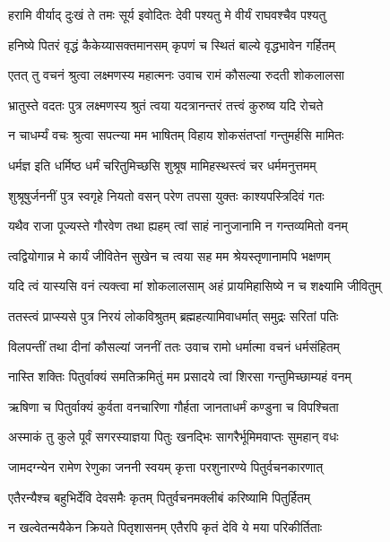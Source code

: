 \twolineshloka
{हरामि वीर्याद् दुःखं ते तमः सूर्य इवोदितः}
{देवी पश्यतु मे वीर्यं राघवश्चैव पश्यतु} %

\twolineshloka
{हनिष्ये पितरं वृद्धं कैकेय्यासक्तमानसम्}
{कृपणं च स्थितं बाल्ये वृद्धभावेन गर्हितम्} %

\twolineshloka
{एतत् तु वचनं श्रुत्वा लक्ष्मणस्य महात्मनः}
{उवाच रामं कौसल्या रुदती शोकलालसा} %

\twolineshloka
{भ्रातुस्ते वदतः पुत्र लक्ष्मणस्य श्रुतं त्वया}
{यदत्रानन्तरं तत्त्वं कुरुष्व यदि रोचते} %

\twolineshloka
{न चाधर्म्यं वचः श्रुत्वा सपत्न्या मम भाषितम्}
{विहाय शोकसंतप्तां गन्तुमर्हसि मामितः} %

\twolineshloka
{धर्मज्ञ इति धर्मिष्ठ धर्मं चरितुमिच्छसि}
{शुश्रूष मामिहस्थस्त्वं चर धर्ममनुत्तमम्} %

\twolineshloka
{शुश्रूषुर्जननीं पुत्र स्वगृहे नियतो वसन्}
{परेण तपसा युक्तः काश्यपस्त्रिदिवं गतः} %

\twolineshloka
{यथैव राजा पूज्यस्ते गौरवेण तथा ह्यहम्}
{त्वां साहं नानुजानामि न गन्तव्यमितो वनम्} %

\twolineshloka
{त्वद्वियोगान्न मे कार्यं जीवितेन सुखेन च}
{त्वया सह मम श्रेयस्तृणानामपि भक्षणम्} %

\twolineshloka
{यदि त्वं यास्यसि वनं त्यक्त्वा मां शोकलालसाम्}
{अहं प्रायमिहासिष्ये न च शक्ष्यामि जीवितुम्} %

\twolineshloka
{ततस्त्वं प्राप्स्यसे पुत्र निरयं लोकविश्रुतम्}
{ब्रह्महत्यामिवाधर्मात् समुद्रः सरितां पतिः} %

\twolineshloka
{विलपन्तीं तथा दीनां कौसल्यां जननीं ततः}
{उवाच रामो धर्मात्मा वचनं धर्मसंहितम्} %

\twolineshloka
{नास्ति शक्तिः पितुर्वाक्यं समतिक्रमितुं मम}
{प्रसादये त्वां शिरसा गन्तुमिच्छाम्यहं वनम्} %

\twolineshloka
{ऋषिणा च पितुर्वाक्यं कुर्वता वनचारिणा}
{गौर्हता जानताधर्मं कण्डुना च विपश्चिता} %

\twolineshloka
{अस्माकं तु कुले पूर्वं सगरस्याज्ञया पितुः}
{खनद्भिः सागरैर्भूमिमवाप्तः सुमहान् वधः} %

\twolineshloka
{जामदग्न्येन रामेण रेणुका जननी स्वयम्}
{कृत्ता परशुनारण्ये पितुर्वचनकारणात्} %

\twolineshloka
{एतैरन्यैश्च बहुभिर्देवि देवसमैः कृतम्}
{पितुर्वचनमक्लीबं करिष्यामि पितुर्हितम्} %

\twolineshloka
{न खल्वेतन्मयैकेन क्रियते पितृशासनम्}
{एतैरपि कृतं देवि ये मया परिकीर्तिताः} %

